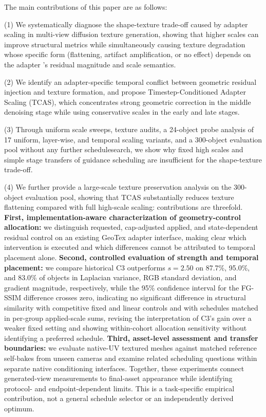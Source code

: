\documentclass[times,twocolumn,final]{elsarticle}
\providecommand{\DIFadd}[1]{{\protect\color{blue} \sf #1}} %
\providecommand{\DIFdel}[1]{{\protect\color{red} \scriptsize #1}} %
\providecommand{\DIFaddbegin}{} %
\providecommand{\DIFaddend}{} %
\providecommand{\DIFdelbegin}{} %
\providecommand{\DIFdelend}{} %
\begin{document}
The \DIFdelbegin \DIFdel{main contributions of this paper are as follows:
}%

\DIFdel{(1) We systematically diagnose the shape-texture trade-off caused by adapter scaling in multi-view diffusion texture generation, showing that higher scales can improve structural metrics while simultaneously causing texture degradation whose specific form (flattening, artifact amplification, or no effect) depends on the adapter 's residual magnitude and scale semantics.
}%

\DIFdel{(2) We identify an adapter-specific temporal conflict between geometric residual injection and texture formation, and propose Timestep-Conditioned Adapter Scaling (TCAS), which concentrates strong geometric correction in the middle denoising stage while using conservative scales in the early and late stages.
}%

\DIFdel{(3) Through uniform scale sweeps, texture audits, a 24-object probe analysis of 17 uniform, layer-wise, and temporal scaling variants, and a 300-object evaluation pool without any further schedulesearch, we show why fixed high scales and simple stage transfers of guidance scheduling are insufficient for the shape-texture trade-off. }%

\DIFdel{(4) We further provide a large-scale texture preservation analysis on the 300-object evaluation pool, showing that TCAS substantially reduces texture flattening compared with full high-scale scaling: }\DIFdelend \DIFaddbegin \DIFadd{contributions are threefold. \textbf{First, implementation-aware characterization of geometry-control allocation:} we distinguish requested, cap-adjusted applied, and state-dependent residual control on an existing GeoTex adapter interface, making clear which intervention is executed and which differences cannot be attributed to temporal placement alone. \textbf{Second, controlled evaluation of strength and temporal placement:} we compare historical }\DIFaddend C3 \DIFdelbegin \DIFdel{outperforms $s = 2.50$ on 87.7\%, 95.0\%, and 83.0\% of objects in Laplacian variance, RGB standard deviation, and gradient magnitude, respectively, while the 95\% confidence interval for the FG-SSIM difference crosses zero, indicating no significant difference in structural similarity}\DIFdelend \DIFaddbegin \DIFadd{with competitive fixed and linear controls and with schedules matched in per-group applied-scale sums, revising the interpretation of C3's gain over a weaker fixed setting and showing within-cohort allocation sensitivity without identifying a preferred schedule. \textbf{Third, asset-level assessment and transfer boundaries:} we evaluate native-UV textured meshes against matched reference self-bakes from unseen cameras and examine related scheduling questions within separate native conditioning interfaces. Together, these experiments connect generated-view measurements to final-asset appearance while identifying protocol- and endpoint-dependent limits. This is a task-specific empirical contribution, not a general schedule selector or an independently derived optimum}\DIFaddend .
\end{document}
